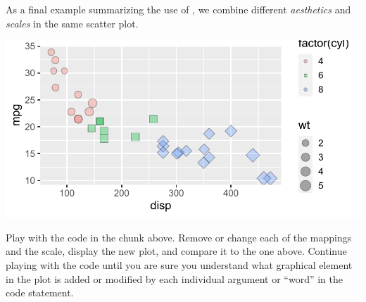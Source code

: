 \documentclass[krantz2]{krantz}\usepackage{knitr}
\begin{document}

As a final example summarizing the use of , we combine different \emph{aesthetics} and \emph{scales} in the same scatter plot.

\begin{knitrout}\footnotesize
{}\color{fgcolor}\begin{kframe}
\begin{alltt}
\hlstd{(}  \hlstd{(}   
                           \hlstd{=} 
                           \hlstd{=} 
                            \hlopt{+}
  \hlstd{(} \hlstd{=} \hlstd{,}  \hlstd{=} \hlstd{)} \hlopt{+}
  \hlstd{()} \hlopt{+}
  \hlstd{(} \hlstd{=} \hlstd{(}\hlstd{,} \hlstd{,} \hlstd{))}
\end{alltt}
\end{kframe}

{\centering \includegraphics[width=.7\textwidth]{figure/pos-scatter-18-1} 

}



\end{knitrout}

\begin{playground}
Play with the code in the chunk above. Remove or change each of the mappings and the scale, display the new plot, and compare it to the one above. Continue playing with the code until you are sure you understand what graphical element in the plot is added or modified by each individual argument or ``word'' in the code statement.
\end{playground}
\end{document}
